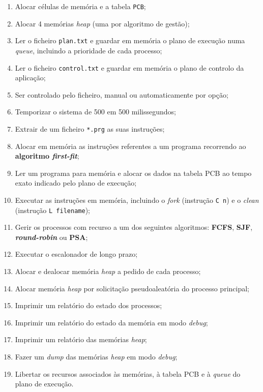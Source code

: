 \documentclass[10pt,oneside]{estiloUBI}
\begin{document}
	\begin{enumerate}
		\item Alocar células de memória e a tabela \texttt{\ac{PCB}};
		\item Alocar 4 memórias \textit{heap} (uma por algoritmo de gestão);
		\item Ler o ficheiro \texttt{plan.txt} e guardar em memória o plano de execução numa \textit{queue}, incluindo a prioridade de cada processo;
		\item Ler o ficheiro \texttt{control.txt} e guardar em memória o plano de controlo da aplicação;
		\item Ser controlado pelo ficheiro, manual ou automaticamente por opção;
		\item Temporizar o sistema de 500 em 500 milissegundos;
		\item Extrair de um ficheiro \texttt{*.prg} as suas instruções;
		\item Alocar em memória as instruções referentes a um programa recorrendo ao \textbf{algoritmo \textit{first-fit}};
		\item Ler um programa para memória e alocar os dados na tabela \ac{PCB} ao tempo exato indicado pelo plano de execução;
		\item Executar as instruções em memória, incluindo o \textit{fork} (instrução \verb|C n|) e o \textit{clean} (instrução \verb|L filename|);
		\item Gerir os processos com recurso a um dos seguintes algoritmos: \textbf{\ac{FCFS}}, \textbf{\ac{SJF}}, \textbf{\textit{round-robin}} ou \textbf{\ac{PSA}};
		\item Executar o escalonador de longo prazo;
		\item Alocar e dealocar memória \textit{heap} a pedido de cada processo;
		\item Alocar memória \textit{heap} por solicitação pseudoaleatória do processo principal;
		\item Imprimir um relatório do estado dos processos;
		\item Imprimir um relatório do estado da memória em modo \textit{debug};
		\item Imprimir um relatório das memórias \textit{heap};
		\item Fazer um \textit{dump} das memórias \textit{heap} em modo \textit{debug};
		\item Libertar os recursos associados às memórias, à tabela \ac{PCB} e à \textit{queue} do plano de execução.
	\end{enumerate}
	
\end{document}
